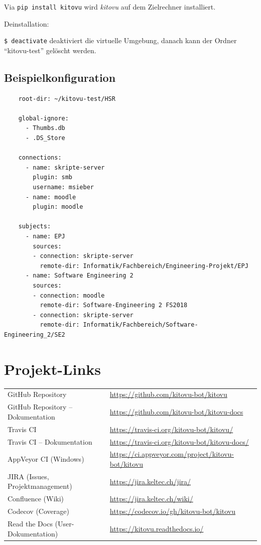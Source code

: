 \documentclass[a4paper]{article}
\let\oldsection\section
\renewcommand\section{\clearpage\oldsection}
\begin{document}
Via \verb|pip install kitovu| wird \emph{kitovu} auf dem Zielrechner installiert.

Deinstallation: 

\verb|$ deactivate| deaktiviert die virtuelle Umgebung, danach kann der Ordner ``kitovu-test'' gelöscht werden.

\newpage

\subsection{Beispielkonfiguration}
	\begin{verbatim}
	root-dir: ~/kitovu-test/HSR
	
	global-ignore:
	  - Thumbs.db
	  - .DS_Store
	
	connections:
	  - name: skripte-server
	    plugin: smb
	    username: msieber
	  - name: moodle
	    plugin: moodle
	
	subjects:
	  - name: EPJ
	    sources:
	    - connection: skripte-server
	      remote-dir: Informatik/Fachbereich/Engineering-Projekt/EPJ
	  - name: Software Engineering 2
	    sources:
	    - connection: moodle
	      remote-dir: Software-Engineering 2 FS2018
	    - connection: skripte-server
	      remote-dir: Informatik/Fachbereich/Software-Engineering_2/SE2
	\end{verbatim}

\section{Projekt-Links}
\begin{tabulary}{\linewidth}{ll}
  GitHub Repository & \url{https://github.com/kitovu-bot/kitovu} \\
  GitHub Repository -- Dokumentation & \url{https://github.com/kitovu-bot/kitovu-docs} \\
  Travis CI & \url{https://travis-ci.org/kitovu-bot/kitovu/} \\
  Travis CI -- Dokumentation & \url{https://travis-ci.org/kitovu-bot/kitovu-docs/} \\
  AppVeyor CI (Windows) & \url{https://ci.appveyor.com/project/kitovu-bot/kitovu} \\
  JIRA (Issues, Projektmanagement) & \url{https://jira.keltec.ch/jira/} \\
  Confluence (Wiki) & \url{https://jira.keltec.ch/wiki/} \\
  Codecov (Coverage) & \url{https://codecov.io/gh/kitovu-bot/kitovu} \\
  Read the Docs (User-Dokumentation) & \url{https://kitovu.readthedocs.io/}
\end{tabulary}
\end{document}
